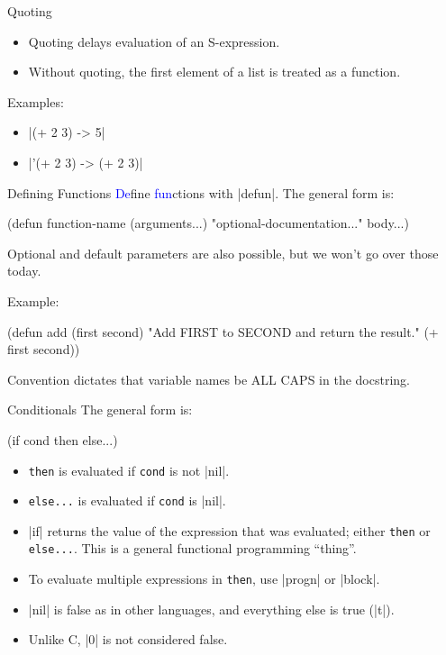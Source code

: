 \documentclass{beamer}
\newcommand{\blue}[1]{\textcolor{blue}{#1}}
\begin{document}

\begin{frame}{Quoting}
  \begin{itemize}
  \item Quoting delays evaluation of an S-expression.
  \item Without quoting, the first element of a list is treated as a function.
  \end{itemize}
Examples:
\begin{itemize}
\item \cl|(+ 2 3) -> 5|
\item \cl|'(+ 2 3) -> (+ 2 3)|
\end{itemize}
\end{frame}

\begin{frame}[fragile]{Defining Functions}
\blue{De}fine \blue{fun}ctions with \cl|defun|. The general form is:
\begin{clcode}
(defun function-name (arguments...)
  "optional-documentation..."
  body...)
\end{clcode}
Optional and default parameters are also possible, but we won't go over those today.

Example:
\begin{clcode}
(defun add (first second)
  "Add FIRST to SECOND and return the result."
  (+ first second))
\end{clcode}
Convention dictates that variable names be ALL CAPS in the docstring.
\end{frame}

\begin{frame}[fragile]{Conditionals}
  The general form is:
  \begin{clcode}
    (if cond then else...)
  \end{clcode}
  \begin{itemize}
  \item \texttt{then} is evaluated if \texttt{cond} is not \cl|nil|.
  \item \texttt{else...} is evaluated if \texttt{cond} is \cl|nil|.
  \item \cl|if| returns the value of the expression that was evaluated; either \texttt{then} or \texttt{else...}. This is a general functional programming ``thing''.
  \item To evaluate multiple expressions in \texttt{then}, use \cl|progn| or \cl|block|.
  \item \cl|nil| is false as in other languages, and everything else is true (\cl|t|).
  \item Unlike C, \cl|0| is not considered false.
  \end{itemize}
\end{frame}
\end{document}
